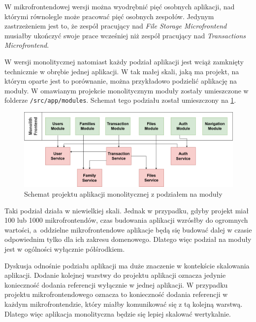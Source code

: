 \documentclass{SGGW-thesis}
\begin{document}
  W mikrofrontendowej wersji można wyodrębnić pięć osobnych aplikacji, nad którymi równolegle może pracować pięć osobnych zespołów. Jedynym zastrzeżeniem jest to, że 
  zespół pracujący nad \textit{File Storage Microfrontend} musiałby ukończyć swoje prace wcześniej niż zespół pracujący nad \textit{Transactions Microfrontend}.

  W wersji monolitycznej natomiast każdy podział aplikacji jest wciąż zamknięty technicznie w obrębie jednej aplikacji. W tak małej skali, jaką ma projekt, na którym oparte jest to porównanie, można przykładowo podzielić aplikację na moduły. W omawianym projekcie monolitycznym moduły zostały umieszczone w folderze \lstinline{/src/app/modules}. Schemat tego podziału został umieszczony na \cref{fig:monolith_fe_modules_diagram}.

  \begin{figure}[h]
    \centering
    \captionsetup{justification=centering}
    \includegraphics[width=\textwidth]{mfe-modules.png}
    \caption{Schemat projektu aplikacji monolitycznej z podziałem na moduły}
    \label{fig:monolith_fe_modules_diagram}
  \end{figure}

  Taki podział działa w niewielkiej skali. Jednak w przypadku, gdyby projekt miał 100 lub 1000 mikrofrontendów, czas budowania aplikacji wzrósłby do ogromnych wartości, a~oddzielne mikrofrontendowe aplikacje będą się budować dalej w czasie odpowiednim tylko dla ich zakresu domenowego. Dlatego więc podział na moduły jest w ogólności wyłącznie półśrodkiem.

  Dyskusja odnośnie podziału aplikacji ma duże znaczenie w kontekście skalowania aplikacji. Dodanie kolejnej warstwy do projektu aplikacji oznacza jedynie konieczność dodania referencji wyłącznie w jednej aplikacji. W przypadku projektu mikrofrontendowego oznacza to konieczność dodania referencji w każdym mikrofrontendzie, który miałby komunikować się z tą kolejną warstwą. Dlatego więc aplikacja monolityczna będzie się lepiej skalować wertykalnie.
\end{document}
